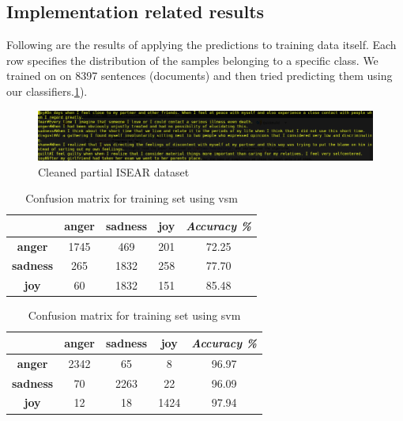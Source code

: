  \subsection{Implementation related results}
 \label{subsec-impl-rel-result}
 Following are the results of applying the predictions to training data itself. Each row specifies the distribution of the samples belonging to a specific class. We trained on on 8397 sentences (documents) and then tried predicting them using our classifiers.\ref{tab-confusion-vsm}). \\

\begin{center}
	\begin{figure}[ht!]
	\label{fig-clean-dataset}	
	\includegraphics[width=18cm,scale=0.5]{data.png}
	\caption{Cleaned partial ISEAR dataset}
	\end{figure}
\end{center}	
\begin{table}[ht!]
  \centering
  \label{tab-confusion-vsm}
  \begin{tabular}{c|c|c|c|c}
  & \textbf{anger} & \textbf{sadness} & \textbf{joy} & \emph{Accuracy \%}\\
  \hline
  \textbf{anger} & 1745 & 469 & 201 & 72.25 \\
  \textbf{sadness} & 265 & 1832 & 258 & 77.70 \\
  \textbf{joy} & 60 & 1832 & 151 & 85.48 \\
  \end{tabular}
  \caption{Confusion matrix for training set using vsm}
\end{table}

\begin{table}[ht!]
  \centering
  \label{tab-confusion-svm}
  \begin{tabular}{c|c|c|c|c}
  & \textbf{anger} & \textbf{sadness} & \textbf{joy} & \emph{Accuracy \%}\\
  \hline
  \textbf{anger} & 2342 & 65 & 8 & 96.97 \\
  \textbf{sadness} & 70 & 2263 & 22 & 96.09 \\
  \textbf{joy} & 12 & 18 & 1424 & 97.94 \\
  \end{tabular}
  \caption{Confusion matrix for training set using svm}
\end{table}

